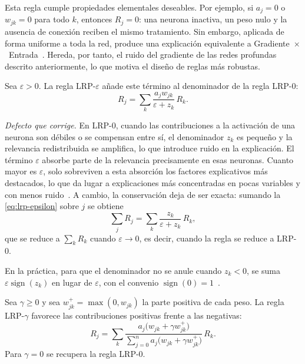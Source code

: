Esta regla cumple propiedades elementales deseables. Por ejemplo, si $a_j = 0$ o
$w_{jk} = 0$ para todo $k$, entonces $R_j = 0$: una neurona inactiva, un peso nulo
y la ausencia de conexión reciben el mismo tratamiento. Sin embargo, aplicada de
forma uniforme a toda la red, produce una explicación equivalente a
Gradiente~$\times$~Entrada~\cite{shrikumar2016,montavon2019lrp}. Hereda, por
tanto, el ruido del gradiente de las redes profundas descrito anteriormente, lo
que motiva el diseño de reglas más robustas.

\begin{definicion}\label{def:lrp-epsilon}
Sea $\varepsilon > 0$. La regla LRP-$\varepsilon$ añade este término al
denominador de la regla LRP-0:
\begin{equation}\label{eq:lrp-epsilon}
  R_j = \sum_{k} \frac{a_j w_{jk}}{\varepsilon + z_k} \, R_k .
\end{equation}
\end{definicion}

\emph{Defecto que corrige.} En LRP-0, cuando las contribuciones a la activación
de una neurona son débiles o se compensan entre sí, el denominador $z_k$ es
pequeño y la relevancia redistribuida se amplifica, lo que introduce ruido en la
explicación. El término $\varepsilon$ absorbe parte de la relevancia
precisamente en esas neuronas. Cuanto mayor es $\varepsilon$, solo sobreviven a
esta absorción los factores explicativos más destacados, lo que da lugar a
explicaciones más concentradas en pocas variables y con menos
ruido~\cite{montavon2019lrp}. A cambio, la conservación deja de ser exacta:
sumando la \cref{eq:lrp-epsilon} sobre $j$ se obtiene
\[
  \sum_{j} R_j = \sum_{k} \frac{z_k}{\varepsilon + z_k} \, R_k ,
\]
que se reduce a $\sum_k R_k$ cuando $\varepsilon \to 0$, es decir, cuando la regla
se reduce a LRP-0.

En la práctica, para que el denominador no se anule cuando $z_k < 0$, se suma
$\varepsilon \operatorname{sign}(z_k)$ en lugar de $\varepsilon$, con el convenio
$\operatorname{sign}(0) = 1$~\cite{achtibat2023}.

\begin{definicion}\label{def:lrp-gamma}
Sea $\gamma \ge 0$ y sea $w^{+}_{jk} = \max(0, w_{jk})$ la parte positiva de cada
peso. La regla LRP-$\gamma$ favorece las contribuciones positivas frente a las
negativas:
\begin{equation}\label{eq:lrp-gamma}
  R_j = \sum_{k} \frac{a_j \bigl(w_{jk} + \gamma w^{+}_{jk}\bigr)}
                      {\sum_{j=0}^{n} a_{j} \bigl(w_{jk} + \gamma w^{+}_{jk}\bigr)} \, R_k .
\end{equation}
Para $\gamma = 0$ se recupera la regla LRP-0.
\end{definicion}

